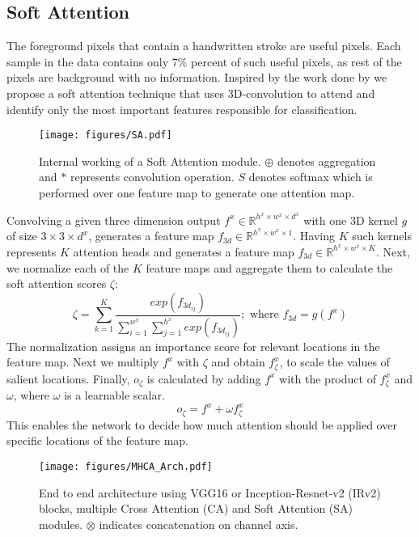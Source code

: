 \documentclass[a4paper,conference]{IEEEtran}
\begin{document}
\subsection{Soft Attention}
The foreground pixels that contain a handwritten stroke are useful pixels. Each sample in the data contains only $7\%$ percent of such useful pixels, as rest of the pixels are background with no information. Inspired by the work done by \cite{tomita_attention-based_2019} we propose a soft attention technique that uses 3D-convolution \cite{tran_learning_2015} to attend and identify only the most important features responsible for classification. 
\begin{figure}[!htp]
\begin{center}
\texttt{[image: figures/SA.pdf]}
\caption{\label{fig:soft_attention} Internal working of a Soft Attention module. $\oplus$ denotes aggregation and $\ast$ represents convolution operation. $S$ denotes softmax which is performed over one feature map to generate one attention map.} 
\end{center}
\end{figure}
\newline \indent Convolving a given three dimension output $f^x \in \mathbb{R}^{h^x \times w^x \times d^x}$ with one 3D kernel $g$ of size $3 \times 3 \times d^x$, generates a feature map $f_{3d} \in \mathbb{R}^{h^x \times w^x \times 1}$.
\newline \indent Having $K$ such kernels represents $K$ attention heads and generates a feature map $f_{3d} \in \mathbb{R}^{h^x \times w^x \times K}$. Next, we normalize each of the $K$ feature maps and aggregate them to calculate the soft attention scores $\zeta$:
\begin{equation}
    \zeta = \sum_{k=1}^{K}{\frac{exp(f_{3d_{ij}})}{\sum_{i=1}^{w^x}\sum_{j=1}^{h^x}{exp(f_{3d_{ij}})}}}; \text{ where } f_{3d} = g(f^x)
    \label{eq:3d_attention}
\end{equation}
The normalization assigns an importance score for relevant locations in the feature map. Next we multiply $f^x$ with $\zeta$ and obtain $f_{\zeta}^{x}$, to scale the values of salient locations. Finally, $o_{\zeta}$ is calculated by adding $f^x$ with the product of $f_{\zeta}^{x}$ and $\omega$, where $\omega$ is a learnable scalar.
\begin{equation}
    o_{\zeta} = f^x + \omega f_{\zeta}^{x}
    \label{eq:3d_attention_output}
\end{equation}
This enables the network to decide how much attention should be applied over specific locations of the feature map.
\begin{figure}[!htp]
\begin{center}
\texttt{[image: figures/MHCA\_Arch.pdf]}
\caption{\label{fig:architecture} End to end architecture using VGG16\cite{vgg16} or Inception-Resnet-v2 (IRv2) \cite{szegedy_inception-v4_2017} blocks, multiple Cross Attention (CA) and Soft Attention (SA) modules. $\otimes$ indicates concatenation on channel axis.}
\end{center}
\end{figure}
\end{document}
